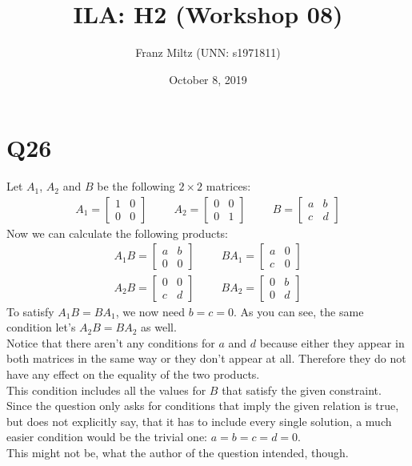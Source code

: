 \documentclass{article}
\title{ILA: H2 (Workshop 08)}
\author{Franz Miltz (UNN: s1971811)}
\date{October 8, 2019}
\begin{document}
\maketitle
\section*{Q26}
Let $A_1$, $A_2$ and $B$ be the following $2\times 2$ matrices:
\begin{align*}
    A_1 = \begin{bmatrix}
        1 & 0 \\ 0 &0
    \end{bmatrix}
    \hspace{1cm} A_2 = \begin{bmatrix}
        0 & 0 \\ 0 &1
    \end{bmatrix}
    \hspace{1cm} B = \begin{bmatrix}
        a & b \\ c &d
    \end{bmatrix}
\end{align*}
Now we can calculate the following products:
\begin{align*}
    A_1B = \begin{bmatrix}
        a & b \\0 &0
    \end{bmatrix}\hspace{1cm}
    BA_1 = \begin{bmatrix}
        a & 0 \\
        c & 0
    \end{bmatrix} \\
    A_2B = \begin{bmatrix}
        0 & 0 \\
        c & d
    \end{bmatrix}\hspace{1cm}
    BA_2 = \begin{bmatrix}
        0 & b \\
        0 & d
    \end{bmatrix}
\end{align*}
To satisfy $A_1B=BA_1$, we now need $b = c = 0$. As you can see, the same condition let's $A_2B=BA_2$ as well.\\
Notice that there aren't any conditions for $a$ and $d$ because either they appear in both matrices in the same way or they don't appear at all.
Therefore they do not have any effect on the equality of the two products.\\
This condition includes all the values for $B$ that satisfy the given constraint.
Since the question only asks for conditions that imply the given relation is true, but does not explicitly say, that it has to include every single solution, a much easier condition would be the trivial one: $a=b=c=d=0$.\\
This might not be, what the author of the question intended, though.
\end{document}
